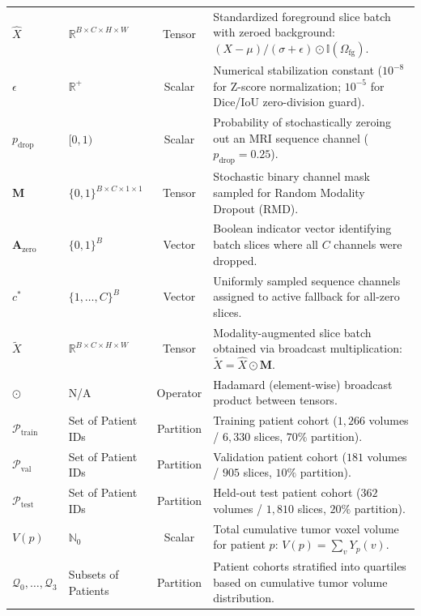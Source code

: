 \documentclass{article}
\begin{document}
\begin{table}[ht]
{\begin{tabular}{llcp{8.6cm}}
$\hat{X}$ & $\mathbb{R}^{B \times C \times H \times W}$ & Tensor & Standardized foreground slice batch with zeroed background: $(X - \mu) / (\sigma + \epsilon) \odot \mathbb{I}(\Omega_{\text{fg}})$. \\
$\epsilon$ & $\mathbb{R}^+$ & Scalar & Numerical stabilization constant ($10^{-8}$ for Z-score normalization; $10^{-5}$ for Dice/IoU zero-division guard). \\
$p_{\text{drop}}$ & $[0, 1)$ & Scalar & Probability of stochastically zeroing out an MRI sequence channel ($p_{\text{drop}} = 0.25$). \\
$\mathbf{M}$ & $\{0, 1\}^{B \times C \times 1 \times 1}$ & Tensor & Stochastic binary channel mask sampled for Random Modality Dropout (RMD). \\
$\mathbf{A}_{\text{zero}}$ & $\{0, 1\}^B$ & Vector & Boolean indicator vector identifying batch slices where all $C$ channels were dropped. \\
$c^*$ & $\{1, \dots, C\}^B$ & Vector & Uniformly sampled sequence channels assigned to active fallback for all-zero slices. \\
$\tilde{X}$ & $\mathbb{R}^{B \times C \times H \times W}$ & Tensor & Modality-augmented slice batch obtained via broadcast multiplication: $\tilde{X} = \hat{X} \odot \mathbf{M}$. \\
$\odot$ & N/A & Operator & Hadamard (element-wise) broadcast product between tensors. \\
$\mathcal{P}_{\text{train}}$ & Set of Patient IDs & Partition & Training patient cohort ($1,266$ volumes / $6,330$ slices, $70\%$ partition). \\
$\mathcal{P}_{\text{val}}$ & Set of Patient IDs & Partition & Validation patient cohort ($181$ volumes / $905$ slices, $10\%$ partition). \\
$\mathcal{P}_{\text{test}}$ & Set of Patient IDs & Partition & Held-out test patient cohort ($362$ volumes / $1,810$ slices, $20\%$ partition). \\
$V(p)$ & $\mathbb{N}_0$ & Scalar & Total cumulative tumor voxel volume for patient $p$: $V(p) = \sum_{v} Y_p(v)$. \\
$\mathcal{Q}_0, \dots, \mathcal{Q}_3$ & Subsets of Patients & Partition & Patient cohorts stratified into quartiles based on cumulative tumor volume distribution. \\
\bottomrule
\end{tabular}%
}
\end{table}
\end{document}
